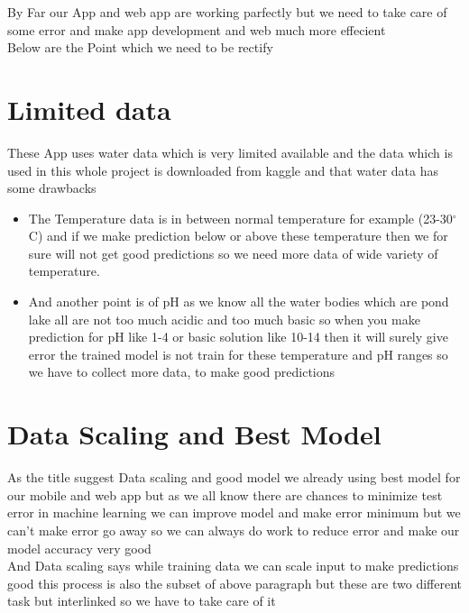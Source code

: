 By Far our App and web app are working parfectly but we need to take care of some error and make app development and web much more effecient\\

Below are the Point which we need to be rectify

\section{Limited data}

These App uses water data which is very limited available and the data which is used in this whole project is downloaded from kaggle and that water data has some drawbacks

\begin{itemize}
  \item The Temperature data is in between normal temperature for example (23-30$^{\circ}$C) and if we make prediction below or above these temperature then we for sure will not get good predictions so we need more data of wide variety of temperature.
  \item And another point is of pH as we know all the water bodies which are pond lake all are not too much acidic and too much basic so when you make prediction for pH like 1-4 or basic solution like 10-14 then it will surely give error the trained model is not train for these temperature and pH ranges so we have to collect more data, to make good predictions
\end{itemize}

\section{Data Scaling and Best Model}

As the title suggest Data scaling and good model we already using best model for our mobile and web app but as we all know there are chances to minimize test error in machine learning we can improve model and make error minimum but we can't make error go away so we can always do work to reduce error and make our model accuracy very good\\

And Data scaling says while training data we can scale input to make predictions good this process is also the subset of above paragraph but these are two different task but interlinked so we have to take care of it\\

